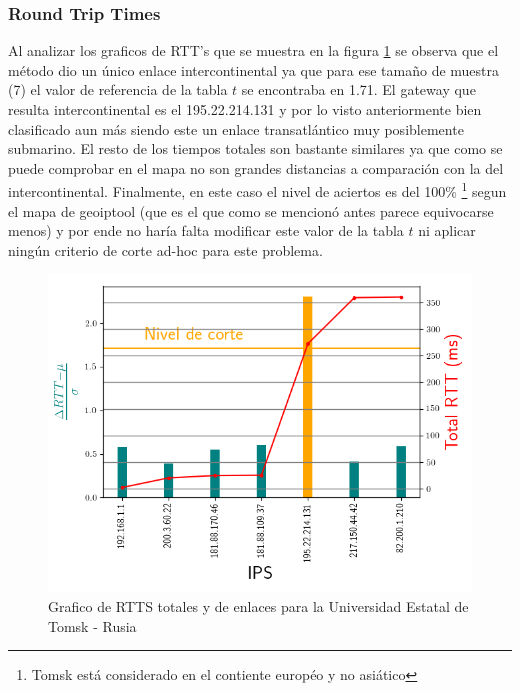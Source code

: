 \subsubsection{Round Trip Times}

Al analizar los graficos de RTT's que se muestra en la figura
\ref{fig:rtts_tsu} se observa que el método dio un único enlace
intercontinental ya que para ese tamaño de muestra (7) el valor de referencia
de la tabla $t$ se encontraba en 1.71. El gateway que resulta intercontinental
es el 195.22.214.131 y por lo visto anteriormente bien clasificado aun más
siendo este un enlace transatlántico muy posiblemente submarino. El resto de los
tiempos totales son bastante similares ya que como se puede comprobar en el mapa
no son grandes distancias a comparación con la del intercontinental. Finalmente,
en este caso el nivel de aciertos es del 100\% \footnote{Tomsk está considerado
en el contiente européo y no asiático} segun el mapa de geoiptool (que es el que como se mencionó
antes parece equivocarse menos) y por ende no haría falta modificar este valor de
la tabla $t$ ni aplicar ningún criterio de corte ad-hoc para este problema.

\begin{figure}[ht]\label{fig:rtts_tsu}
	\begin{center}
		\includegraphics[width=0.8\columnwidth]{imagenes/rtts_tsu.png}
		\caption{Grafico de RTTS totales y de enlaces para la Universidad Estatal de Tomsk - Rusia}
	\end{center}
\end{figure}
